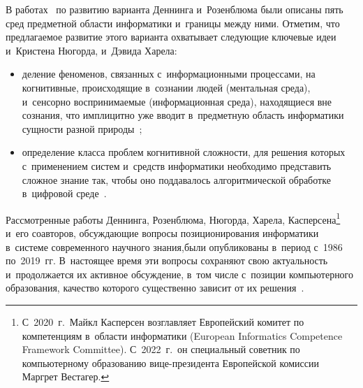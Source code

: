 \begin{multicols}{2}
  В работах~\cite{3-zac, 16-zac} по развитию варианта Деннинга 
и~Розенблюма были описаны пять сред предметной области информатики 
и~границы между ними. Отметим, что предлагаемое развитие этого варианта 
охватывает следующие ключевые идеи и~Кристена Нюгорда, и~Дэвида Харела:
  \begin{itemize}
  \item   деление феноменов, связанных с~информационными процессами, на 
когнитивные, происходящие в~сознании людей (ментальная среда), 
и~сенсорно воспринимаемые (\mbox{информационная} среда), находящиеся вне 
сознания, что имплицитно уже вводит в~предметную область информатики 
сущности разной природы~\cite{8-zac};
  \item определение класса проблем когнитивной сложности, для решения 
которых с~применением систем и~средств информатики необходимо 
представить сложное знание так, чтобы оно поддавалось алгоритмической 
обработке в~циф\-ро\-вой среде~\cite{9-zac}.
  \end{itemize}
  

  
Рассмотренные работы Деннинга, Розенблюма, Нюгорда, Харела, 
Касперсена\footnote{С~2020~г.\ Майкл Касперсен возглавляет Европейский комитет по 
компетенциям в~области информатики (European Informatics Competence Framework Committee). С~2022~г.\ 
он специальный советник по компьютерному образованию вице-президента Европейской комиссии 
Маргрет Вестагер.} и~его соавторов, об\-суж\-да\-ющие вопросы позиционирования 
информатики в~сис\-те\-ме современного научного знания,\linebreak были опубликованы 
в~период с~1986 по~2019~гг. В~настоящее время эти вопросы сохраняют 
свою актуальность и~продолжается их активное обсуждение, в~том числе 
с~позиции компьютерного образования, качество которого существенно 
зависит от их решения~\cite{18-zac}.

 
  

\end{multicols}
